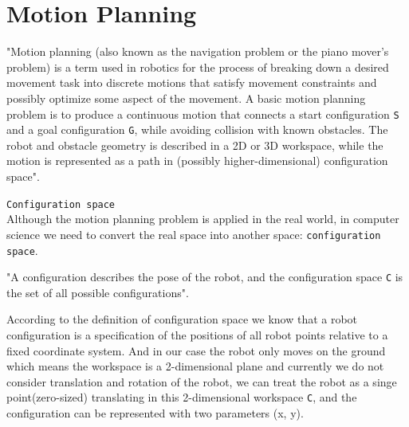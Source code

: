 \chapter{Motion Planning}
\label{chap:Motion_planning}

"Motion planning (also known as the navigation problem or the piano mover's problem) is a term used in robotics for the process of breaking down a desired movement task into discrete motions that satisfy movement constraints and possibly optimize some aspect of the movement.
A basic motion planning problem is to produce a continuous motion that connects a start configuration \texttt{S} and a goal configuration \texttt{G}, while avoiding collision with known obstacles. The robot and obstacle geometry is described in a 2D or 3D workspace, while the motion is represented as a path in (possibly higher-dimensional) configuration space"\cite{wiki_motion_planning}.

\texttt{Configuration space}\\
Although the motion planning problem is applied in the real world, in computer science we need to convert the real space into another space: \texttt{configuration space}.

"A configuration describes the pose of the robot, and the configuration space \texttt{C} is the set of all possible configurations"\cite{wiki_motion_planning}.

According to the definition of configuration space we know that a robot configuration is a specification of the positions of all robot points relative to a fixed coordinate system. And in our case the robot only moves on the ground which means the workspace is a 2-dimensional plane and currently we do not consider translation and rotation of the robot, we can treat the robot as a singe point(zero-sized) translating in this 2-dimensional workspace \texttt{C}, and the configuration can be represented with two parameters (x, y).  

